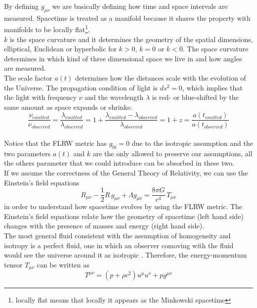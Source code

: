 \documentclass{article}
\begin{document}
By defining $g_{\mu \nu}$ we are basically  defining how time and space intervals are measured.
Spacetime is treated as a manifold because it shares the property with manifolds to be locally flat\footnote{locally flat means  that locally it appears as the Minkowski spacetime}.\\
$k$ is the space curvature and it determines the geometry of the spatial dimensions, elliptical, Euclidean or hyperbolic for $k>0$, $k=0$ or $k<0$.
The space curvature determines in which kind of three dimensional space we live in and how angles are measured.\\
The scale factor $a(t)$ determines how the distances scale with the evolution of the Universe.
The propagation condition of light is $ds^2 =0$, which implies that the light with frequency $\nu$ and the wavelength $\lambda$ is red- or blue-shifted by the same amount as space expands or shrinks:
\begin{equation}
\dfrac{\nu_{emitted}}{\nu_{observed}} = \dfrac{\lambda_{emitted}}{\lambda_{observed}} = 1 + \dfrac{\lambda_{emitted}-\lambda_{observed}}{\lambda_{observed}}=1+z= \dfrac{a(t_{emitted})}{a(t_{observed})}
\end{equation}
\\
Notice that the FLRW metric has $g_{0 i}=0$ due to the isotropic assumption and the two parameters $a(t)$ and $k$ are the only allowed to preserve our assumptions, all the others parameter that we could introduce can be absorbed in these two.
\\ %
If we assume the correctness of the General Theory of Relativity, we can use the Einstein's field equations
\begin{equation}
\label{einstein_eq}
R_{\mu \nu} - \dfrac{1}{2} R \, g _{\mu \nu} + \Lambda g_{\mu \nu}= \dfrac{8 \pi G}{c^4} \, T_{\mu \nu}
\end{equation}
in order to understand how spacetime evolves by using the FLRW metric.
The Einstein's field equations relate how the geometry of spacetime (left hand side) changes with the presence of masses and energy (right hand side).\\
The most general fluid consistent with the assumption of homogeneity and isotropy is a perfect fluid, one in which an observer comoving with the fluid would see the universe around it as isotropic \citep{garcia-bellidoAstrophysicsCosmology2000}. Therefore, the energy-momentum tensor $T_{\mu \nu}$ can be written as
\begin{equation}
\label{energy-momentum-tensor}
T^{\mu \nu } = (p + \rho c^2)u ^{\mu} u^{\nu}+p g^{\mu \nu} 
\end{equation}
\end{document}
